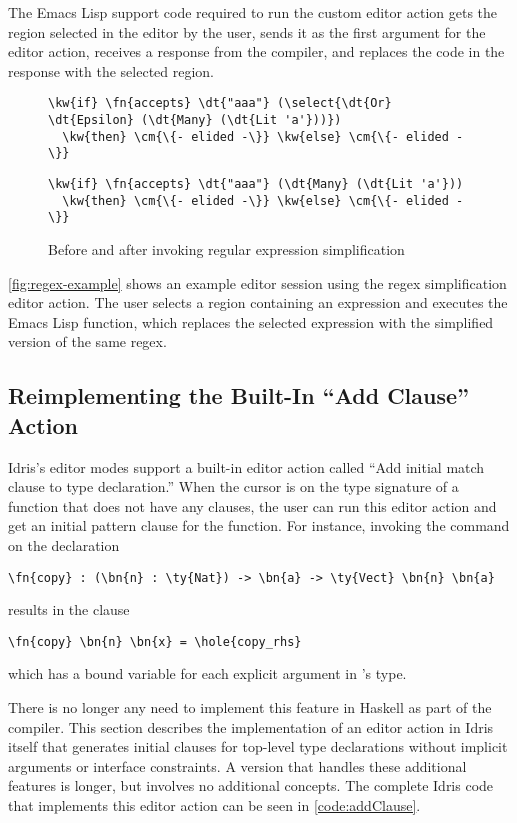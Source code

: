 The Emacs Lisp support code required to run the custom editor action gets the
region selected in the editor by the user, sends it as the first argument for
the  editor action, receives a response from the compiler,
and replaces the code in the response with the selected region.


\begin{figure}[ht]
\begin{Verbatim}
\kw{if} \fn{accepts} \dt{"aaa"} (\select{\dt{Or} \dt{Epsilon} (\dt{Many} (\dt{Lit 'a'}))})
  \kw{then} \cm{\{- elided -\}} \kw{else} \cm{\{- elided -\}}
\end{Verbatim}
  \vspace{1em}
\begin{Verbatim}
\kw{if} \fn{accepts} \dt{"aaa"} (\dt{Many} (\dt{Lit 'a'}))
  \kw{then} \cm{\{- elided -\}} \kw{else} \cm{\{- elided -\}}
\end{Verbatim}
\caption{Before and after invoking regular expression simplification}
  \label{fig:regex-example}
\end{figure}

\autoref{fig:regex-example} shows an example editor session using the regex
simplification editor action. The user selects a region containing an
expression and executes the Emacs Lisp function, which replaces the selected
expression with the simplified version of the same regex.

\subsection{Reimplementing the Built-In ``Add Clause'' Action}\label{sec:addClause}

Idris's editor modes support a built-in editor action called ``Add initial match
clause to type declaration.'' When the cursor is on the type signature of a
function that does not have any clauses, the user can run this editor action
and get an initial pattern clause for the function.
For instance, invoking the command on the declaration
\begin{Verbatim}
\fn{copy} : (\bn{n} : \ty{Nat}) -> \bn{a} -> \ty{Vect} \bn{n} \bn{a}
\end{Verbatim}
results in the clause
\begin{Verbatim}
\fn{copy} \bn{n} \bn{x} = \hole{copy_rhs}
\end{Verbatim}
which has a bound variable for each explicit argument in 's type.

There is no longer any need to implement this feature in Haskell as
part of the compiler. This section describes the implementation of an
editor action in Idris itself that generates initial clauses for top-level
type declarations without implicit arguments or interface
constraints. A version that handles these additional features is
longer, but involves no additional concepts. The complete Idris code that
implements this editor action can be seen in \autoref{code:addClause}.

